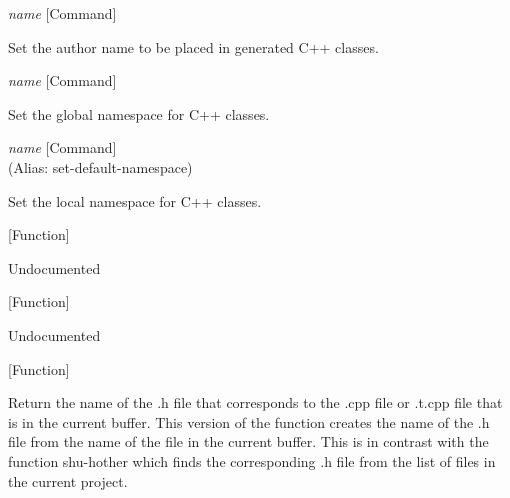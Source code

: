 \vspace{1em}
\noindent
{}
\usebox{\funcname}\emph{name}
 \hfill [Command]

\begin{doc-string}
Set the author name to be placed in generated C++ classes.
\end{doc-string}

\vspace{1em}
\noindent
{}
\usebox{\funcname}\emph{name}
 \hfill [Command]

\begin{doc-string}
Set the global namespace for C++ classes.
\end{doc-string}

\vspace{1em}
\noindent
{}
\usebox{\funcname}\emph{name}
 \hfill [Command]\\%
 (Alias: set-default-namespace)

\begin{doc-string}
Set the local namespace for C++ classes.
\end{doc-string}

\vspace{1em}
\noindent
{}
\usebox{\funcname}
 \hfill [Function]

\begin{doc-string}
Undocumented
\end{doc-string}

\vspace{1em}
\noindent
{}
\usebox{\funcname}
 \hfill [Function]

\begin{doc-string}
Undocumented
\end{doc-string}

\vspace{1em}
\noindent
{}
\usebox{\funcname}
 \hfill [Function]

\begin{doc-string}
Return the name of the .h file that corresponds to the .cpp file or .t.cpp file
that is in the current buffer.  This version of the function creates the name of
the .h file from the name of the file in the current buffer.  This is in contrast
with the function shu-hother which finds the corresponding .h file from the list
of files in the current project.
\end{doc-string}

